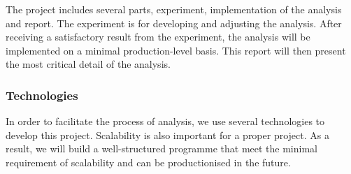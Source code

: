 \documentclass[11pt]{article} %
\theoremstyle{plain}
\theoremstyle{definition}
\begin{document}
The project includes several parts, experiment, implementation of the analysis and report. The experiment is for developing and adjusting the analysis. After receiving a satisfactory result from the experiment, the analysis will be implemented on a minimal production-level basis. This report will then present the most critical detail of the analysis.

\subsubsection{Technologies}

In order to facilitate the process of analysis, we use several technologies to develop this project. Scalability is also important for a proper project. As a result, we will build a well-structured programme that meet the minimal requirement of scalability and can be productionised in the future.
\end{document}
